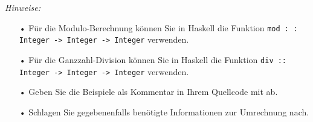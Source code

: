 \textit{Hinweise:}

\begin{itemize}
  \item [•] Für die Modulo-Berechnung können Sie in Haskell die Funktion \texttt{mod : : Integer -> Integer -> Integer} verwenden.

  \item [•] Für die Ganzzahl-Division können Sie in Haskell die Funktion \texttt{div :: Integer -> Integer -> Integer} verwenden.

  \item [•] Geben Sie die Beispiele als Kommentar in Ihrem Quellcode mit ab.

  \item [•] Schlagen Sie gegebenenfalls benötigte Informationen zur Umrechnung nach.
\end{itemize}

\newpage

\begin{itemize}
  \item [] \inputminted{Haskell}{P3_4.hs}
\end{itemize}
